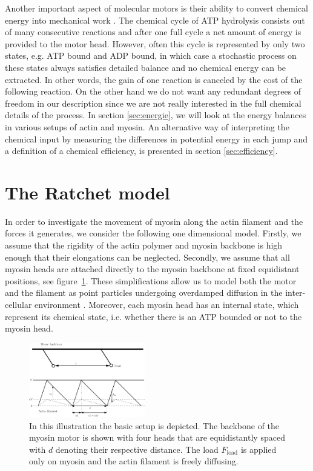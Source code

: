 \documentclass[aps,pre,twocolumn,showpacs,showkeys,superscriptaddress,floatfix]{revtex4-1}
\begin{document}
Another important aspect of molecular motors is their ability to convert chemical energy into mechanical work \cite{astumian1996mechanochemical}.
The chemical cycle of ATP hydrolysis consists out of many consecutive reactions and after one full cycle a net amount of energy is provided to the motor head.
However, often this cycle is represented by only two states, e.g. ATP bound and ADP bound, 
in which case a stochastic process on these states always satisfies detailed balance and no chemical energy can be extracted. 
In other words, the gain of one reaction is canceled by the cost of the following reaction.
On the other hand we do not want any redundant degrees of freedom in our description since we are not really interested in the full chemical details of the process.
In section \ref{sec:energie}, we will look at the energy balances in various setups of actin and myosin.
An alternative way of interpreting the chemical input by measuring the differences in potential energy in each jump and a definition of a chemical efficiency, is presented in section \ref{sec:efficiency}.

\section{The Ratchet model}
\label{sec:ratchet}
In order to investigate the movement of myosin along the actin filament and the forces it generates, we consider the following one dimensional model.
Firstly, we assume that the rigidity of the actin polymer and myosin backbone is high enough that their elongations can be neglected.
Secondly, we assume that all myosin heads are attached directly to the myosin backbone at fixed equidistant positions, see figure~\ref{fig:ratchet setup}.
These simplifications allow us to model both the motor and the filament as point particles undergoing overdamped diffusion in the inter-cellular environment \cite{vanKampen1981stochastic}.
Moreover, each myosin head has an internal state, which represent its chemical state, 
i.e. whether there is an ATP bounded or not to the myosin head. 
\begin{figure}[t]
\centering
\includegraphics[width=0.45\textwidth,height=!]{ratchet_illustration}
\caption{
\label{fig:ratchet setup}
In this illustration the basic setup is depicted.  
The backbone of the myosin motor is shown with four heads that are equidistantly spaced with $d$ denoting their respective distance. 
The load $F_\text{load}$ is applied only on myosin and the actin filament is freely diffusing. 
} 
\end{figure}
\end{document}
